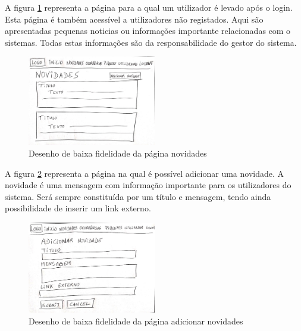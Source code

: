 \FloatBarrier
A figura \ref{fig:novidades} representa a página para a qual um utilizador é levado após o login. Esta página é também acessível a utilizadores não registados. Aqui são apresentadas pequenas noticias ou informações importante relacionadas com o sistemas. Todas estas informações são da responsabilidade do gestor do sistema.
\begin{figure}[!htb]
	\centering
	\includegraphics[width=0.5\textwidth, frame]{figuras/storyboard/frame_2.jpg}
	\caption{Desenho de baixa fidelidade da página novidades}
	\label{fig:novidades}
\end{figure}

\FloatBarrier
A figura \ref{fig:adicionar_novidades} representa a página na qual é possível adicionar uma novidade. A novidade é uma mensagem com informação importante para os utilizadores do sistema. Será sempre constituída por um título e mensagem, tendo ainda possibilidade de inserir um link externo.  
\begin{figure}[!htb]
	\centering
	\includegraphics[width=0.5\textwidth, frame]{figuras/storyboard/frame_3.jpg}
	\caption{Desenho de baixa fidelidade da página adicionar novidades}
	\label{fig:adicionar_novidades}
\end{figure}

